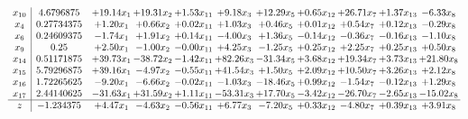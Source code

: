 \documentclass[9pt]{article}
\begin{document}
\[\begin{array}{c| c c@{\hskip 2pt} c@{\hskip 2pt} c@{\hskip 2pt} c@{\hskip 2pt} c@{\hskip 2pt} c@{\hskip 2pt} c@{\hskip 2pt} c@{\hskip 2pt} c@{\hskip 2pt} }
 x_{10}   &  4.6796875 & + 19.14 x_{1} & + 19.31 x_{2} & +  1.53 x_{11} & +  9.18 x_{3} & + 12.29 x_{5} & +  0.65 x_{12} & + 26.71 x_{7} & +  1.37 x_{13} & -6.33 x_{8}\\
 x_{4}   &  0.27734375 & +  1.20 x_{1} & +  0.66 x_{2} & +  0.02 x_{11} & +  1.03 x_{3} & +  0.46 x_{5} & +  0.01 x_{12} & +  0.54 x_{7} & +  0.12 x_{13} & -0.29 x_{8}\\
 x_{6}   &  0.24609375 & -1.74 x_{1} & +  1.91 x_{2} & +  0.14 x_{11} & -4.00 x_{3} & +  1.36 x_{5} & -0.14 x_{12} & -0.36 x_{7} & -0.16 x_{13} & -1.10 x_{8}\\
 x_{9}   &  0.25 & +  2.50 x_{1} & -1.00 x_{2} & -0.00 x_{11} & +  4.25 x_{3} & -1.25 x_{5} & +  0.25 x_{12} & +  2.25 x_{7} & +  0.25 x_{13} & +  0.50 x_{8}\\
 x_{14}   &  0.51171875 & + 39.73 x_{1} & -38.72 x_{2} & -1.42 x_{11} & + 82.26 x_{3} & -31.34 x_{5} & +  3.68 x_{12} & + 19.34 x_{7} & +  3.73 x_{13} & + 21.80 x_{8}\\
 x_{15}   &  5.79296875 & + 39.16 x_{1} & -4.97 x_{2} & -0.55 x_{11} & + 41.54 x_{3} & +  1.50 x_{5} & +  2.09 x_{12} & + 10.50 x_{7} & +  3.26 x_{13} & +  2.12 x_{8}\\
 x_{16}   &  1.72265625 & -9.20 x_{1} & -6.66 x_{2} & -0.02 x_{11} & -1.03 x_{3} & -18.46 x_{5} & +  0.99 x_{12} & -1.54 x_{7} & -0.12 x_{13} & +  1.29 x_{8}\\
 x_{17}   &  2.44140625 & -31.63 x_{1} & + 31.59 x_{2} & +  1.11 x_{11} & -53.31 x_{3} & + 17.70 x_{5} & -3.42 x_{12} & -26.70 x_{7} & -2.65 x_{13} & -15.02 x_{8}\\
\hline
z    &  -1.234375 & +  4.47 x_{1} & -4.63 x_{2} & -0.56 x_{11} & +  6.77 x_{3} & -7.20 x_{5} & +  0.33 x_{12} & -4.80 x_{7} & +  0.39 x_{13} & +  3.91 x_{8}\\
\end{array}\]
\end{document}
